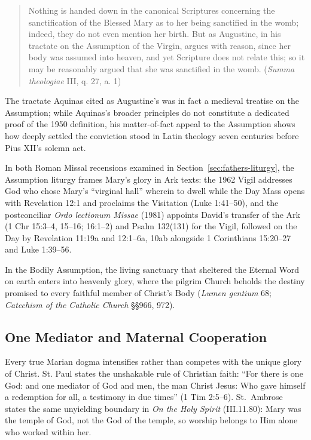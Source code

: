 \begin{quote}\small
Nothing is handed down in the canonical Scriptures concerning the sanctification of the Blessed Mary as to her being sanctified in the womb; indeed, they do not even mention her birth. But as Augustine, in his tractate on the Assumption of the Virgin, argues with reason, since her body was assumed into heaven, and yet Scripture does not relate this; so it may be reasonably argued that she was sanctified in the womb. (\textit{Summa theologiae} III, q. 27, a. 1)
\end{quote}

The tractate Aquinas cited as Augustine's was in fact a medieval treatise on the Assumption; while Aquinas's broader principles do not constitute a dedicated proof of the 1950 definition, his matter-of-fact appeal to the Assumption shows how deeply settled the conviction stood in Latin theology seven centuries before Pius XII's solemn act.

In both Roman Missal recensions examined in Section~\ref{sec:fathers-liturgy}, the Assumption liturgy frames Mary's glory in Ark texts: the 1962 Vigil addresses God who chose Mary's ``virginal hall'' wherein to dwell while the Day Mass opens with Revelation 12:1 and proclaims the Visitation (Luke 1:41--50), and the postconciliar \textit{Ordo lectionum Missae} (1981) appoints David's transfer of the Ark (1 Chr 15:3--4, 15--16; 16:1--2) and Psalm 132(131) for the Vigil, followed on the Day by Revelation 11:19a and 12:1--6a, 10ab alongside 1 Corinthians 15:20--27 and Luke 1:39--56.

In the Bodily Assumption, the living sanctuary that sheltered the Eternal Word on earth enters into heavenly glory, where the pilgrim Church beholds the destiny promised to every faithful member of Christ's Body (\textit{Lumen gentium} 68; \textit{Catechism of the Catholic Church} \S\S 966, 972).

\subsection{One Mediator and Maternal Cooperation}\label{subsec:one-mediator}

Every true Marian dogma intensifies rather than competes with the unique glory of Christ. St. Paul states the unshakable rule of Christian faith: ``For there is one God: and one mediator of God and men, the man Christ Jesus: Who gave himself a redemption for all, a testimony in due times'' (1 Tim 2:5--6). St.\ Ambrose states the same unyielding boundary in \textit{On the Holy Spirit} (III.11.80): Mary was the temple of God, not the God of the temple, so worship belongs to Him alone who worked within her.

